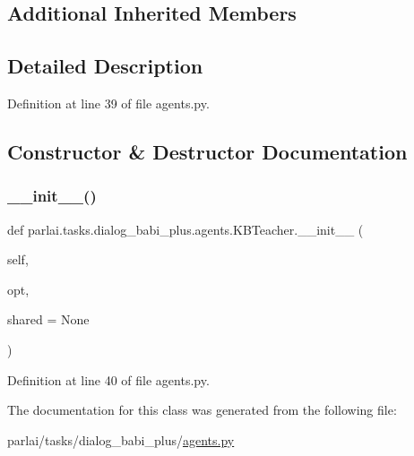 \subsection*{Additional Inherited Members}


\subsection{Detailed Description}


Definition at line 39 of file agents.\+py.



\subsection{Constructor \& Destructor Documentation}
\mbox{\label{classparlai_1_1tasks_1_1dialog__babi__plus_1_1agents_1_1KBTeacher_aa291d9b9f60df40b085271f0dd7d3b0e}} 
\subsubsection{\texorpdfstring{\+\_\+\+\_\+init\+\_\+\+\_\+()}{\_\_init\_\_()}}
{\footnotesize\ttfamily def parlai.\+tasks.\+dialog\+\_\+babi\+\_\+plus.\+agents.\+K\+B\+Teacher.\+\_\+\+\_\+init\+\_\+\+\_\+ (\begin{DoxyParamCaption}\item[{}]{self,  }\item[{}]{opt,  }\item[{}]{shared = {\ttfamily None} }\end{DoxyParamCaption})}



Definition at line 40 of file agents.\+py.



The documentation for this class was generated from the following file\+:\begin{DoxyCompactItemize}
\item 
parlai/tasks/dialog\+\_\+babi\+\_\+plus/\hyperlink{parlai_2tasks_2dialog__babi__plus_2agents_8py}{agents.\+py}\end{DoxyCompactItemize}
